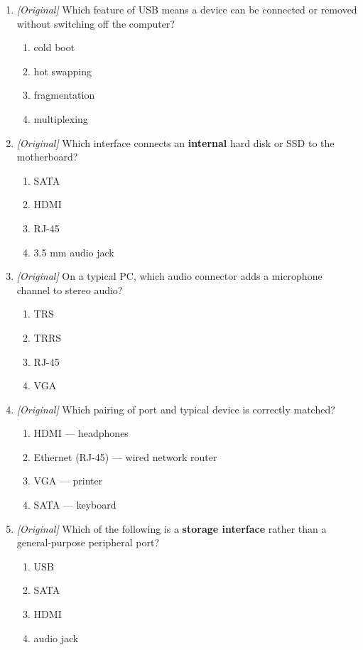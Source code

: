 \documentclass[11pt]{article}
\begin{document}
\begin{enumerate}[label=\textbf{Q\arabic*.}, leftmargin=*]
\begin{enumerate}[label=\Alph*.]
  \end{enumerate}
\item \textit{[Original]} Which feature of USB means a device can be
  connected or removed without switching off the computer?
  \begin{enumerate}[label=\Alph*.]
    \item cold boot
    \item hot swapping
    \item fragmentation
    \item multiplexing
  \end{enumerate}
\item \textit{[Original]} Which interface connects an \textbf{internal} hard
  disk or SSD to the motherboard?
  \begin{enumerate}[label=\Alph*.]
    \item SATA
    \item HDMI
    \item RJ-45
    \item 3.5 mm audio jack
  \end{enumerate}
\item \textit{[Original]} On a typical PC, which audio connector adds a
  microphone channel to stereo audio?
  \begin{enumerate}[label=\Alph*.]
    \item TRS
    \item TRRS
    \item RJ-45
    \item VGA
  \end{enumerate}
\item \textit{[Original]} Which pairing of port and typical device is
  correctly matched?
  \begin{enumerate}[label=\Alph*.]
    \item HDMI --- headphones
    \item Ethernet (RJ-45) --- wired network router
    \item VGA --- printer
    \item SATA --- keyboard
  \end{enumerate}
\item \textit{[Original]} Which of the following is a \textbf{storage
  interface} rather than a general-purpose peripheral port?
  \begin{enumerate}[label=\Alph*.]
    \item USB
    \item SATA
    \item HDMI
    \item audio jack

\end{enumerate}
\end{enumerate}
\end{document}

